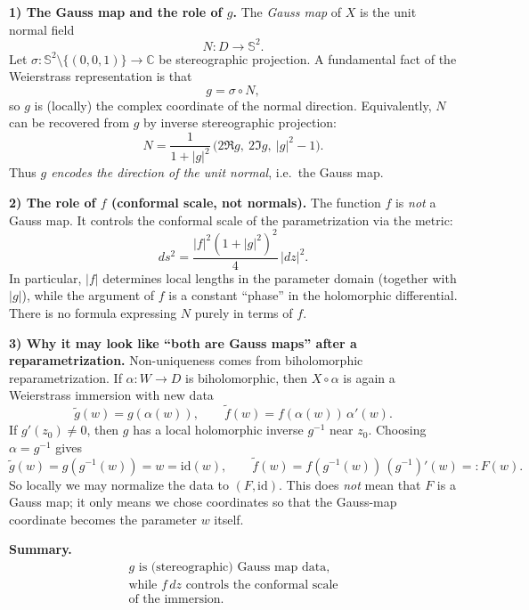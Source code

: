 \begin{problem}[CP-IV-0089]
	\smallskip
	\textbf{1) The Gauss map and the role of $g$.}
	The \emph{Gauss map} of $X$ is the unit normal field
	\[
	N:D\to \mathbb S^2.
	\]
	Let $\sigma:\mathbb S^2\setminus\{(0,0,1)\}\to\mathbb C$ be stereographic projection. A fundamental fact of the Weierstrass
	representation is that
	\[
	g=\sigma\circ N,
	\]
	so $g$ is (locally) the complex coordinate of the normal direction. Equivalently, $N$ can be recovered from $g$ by inverse
	stereographic projection:
	\[
	N
	=
	\frac{1}{1+|g|^2}\,\bigl(2\Re g,\ 2\Im g,\ |g|^2-1\bigr).
	\]
	Thus \emph{$g$ encodes the direction of the unit normal}, i.e.\ the Gauss map.

	\smallskip
	\textbf{2) The role of $f$ (conformal scale, not normals).}
	The function $f$ is \emph{not} a Gauss map. It controls the conformal scale of the parametrization via the metric:
	\[
	ds^2=\frac{|f|^2(1+|g|^2)^2}{4}\,|dz|^2.
	\]
	In particular, $|f|$ determines local lengths in the parameter domain (together with $|g|$), while the argument of $f$ is a
	constant ``phase'' in the holomorphic differential. There is no formula expressing $N$ purely in terms of $f$.

	\smallskip
	\textbf{3) Why it may look like ``both are Gauss maps'' after a reparametrization.}
	Non-uniqueness comes from biholomorphic reparametrization. If $\alpha:W\to D$ is biholomorphic, then
	$X\circ\alpha$ is again a Weierstrass immersion with new data
	\[
	\tilde g(w)=g(\alpha(w)),
	\qquad
	\tilde f(w)=f(\alpha(w))\,\alpha'(w).
	\]
	If $g'(z_0)\neq 0$, then $g$ has a local holomorphic inverse $g^{-1}$ near $z_0$. Choosing $\alpha=g^{-1}$ gives
	\[
	\tilde g(w)=g(g^{-1}(w))=w=\mathrm{id}(w),
	\qquad
	\tilde f(w)=f(g^{-1}(w))\,(g^{-1})'(w)=:F(w).
	\]
	So locally we may normalize the data to $(F,\mathrm{id})$. This does \emph{not} mean that $F$ is a Gauss map; it only means we
	chose coordinates so that the Gauss-map coordinate becomes the parameter $w$ itself.

	\smallskip
	\textbf{Summary.}
\[
\boxed{\begin{gathered}
\text{$g$ is (stereographic) Gauss map data,}
\\
\text{while $f\,dz$ controls the conformal scale}
\\
\text{of the immersion.}
\end{gathered}}
\]


\end{problem}
